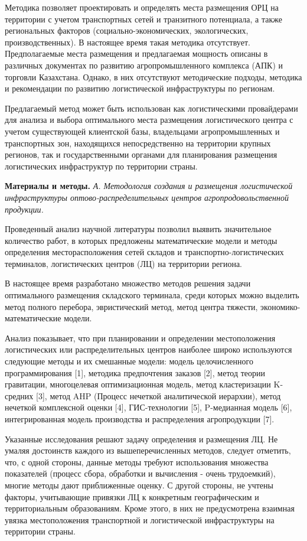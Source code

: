 Методика позволяет проектировать и определять места размещения ОРЦ на
территории с учетом транспортных сетей и транзитного потенциала, а также
региональных факторов (социально-экономических, экологических,
производственных). В настоящее время такая методика отсутствует.
Предполагаемые места размещения и предлагаемая мощность описаны в
различных документах по развитию агропромышленного комплекса (АПК) и
торговли Казахстана. Однако, в них отсутствуют методические подходы,
методика и рекомендации по развитию логистической инфраструктуры по
регионам.

Предлагаемый метод может быть использован как логистическими
провайдерами для анализа и выбора оптимального места размещения
логистического центра с учетом существующей клиентской базы, владельцами
агропромышленных и транспортных зон, находящихся непосредственно на
территории крупных регионов, так и государственными органами для
планирования размещения логистических инфраструктур по территории
страны.

{\bfseries Материалы и методы.} \emph{А. Методология создания и размещения
логистической инфраструктуры оптово-распределительных центров
агропродовольственной продукции.}

Проведенный анализ научной литературы позволил выявить значительное
количество работ, в которых предложены математические модели и методы
определения месторасположения сетей складов и транспортно-логистических
терминалов, логистических центров (ЛЦ) на территории региона.

В настоящее время разработано множество методов решения задачи
оптимального размещения складского терминала, среди которых можно
выделить метод полного перебора, эвристический метод, метод центра
тяжести, экономико-математические модели.

Анализ показывает, что при планировании и определении местоположения
логистических или распределительных центров наиболее широко используются
следующие методы и их смешанные модели: модель целочисленного
программирования {[}1{]}, методика предпочтения заказов {[}2{]}, метод
теории гравитации, многоцелевая оптимизационная модель, метод
кластеризации K-средних {[}3{]}, метод AHP (Процесс нечеткой
аналитической иерархии), метод нечеткой комплексной оценки {[}4{]},
ГИС-технологии {[}5{]}, P-медианная модель {[}6{]}, интегрированная
модель производства и распределения агропродукции {[}7{]}.

Указанные исследования решают задачу определения и размещения ЛЦ. Не
умаляя достоинств каждого из вышеперечисленных методов, следует
отметить, что, с одной стороны, данные методы требуют использования
множества показателей (процесс сбора, обработки и вычисления - очень
трудоемкий), многие методы дают приближенные оценку. С другой стороны,
не учтены факторы, учитывающие привязки ЛЦ к конкретным географическим и
территориальным образованиям. Кроме этого, в них не предусмотрена
взаимная увязка местоположения транспортной и логистической
инфраструктуры на территории страны.

